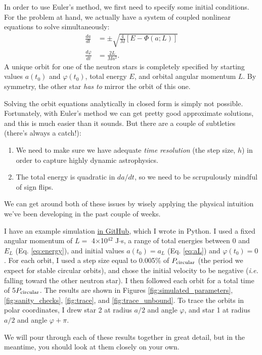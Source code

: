 \documentclass[11pt]{article}
\begin{document}
\begin{enumerate}
\hspace{15pt} In order to use Euler's method, we first need to specify some initial conditions. For the problem at hand, we actually have a system of coupled nonlinear equations to solve simultaneously:
\begin{align*}
\frac{da}{dt} &= \pm \sqrt{ \frac{4}{M} \left[ E - \Phi(a; L) \right] } \\
\frac{d\varphi}{dt} &= \frac{2L}{Ma^2}.
\end{align*}
A unique orbit for one of the neutron stars is completely specified by starting values $a(t_0)$ and $\varphi(t_0)$, total energy $E$, and orbital angular momentum $L$. By symmetry, the other star \emph{has to} mirror the orbit of this one.

\hspace{2pt} Solving the orbit equations analytically in closed form is simply not possible. Fortunately, with Euler's method we can get pretty good approximate solutions, and this is much easier than it sounds. But there are a couple of subtleties (there's always a catch!):
\begin{enumerate}
\item We need to make sure we have adequate \textit{time resolution} (the step size, $h$) in order to capture highly dynamic astrophysics.

\item The total energy is quadratic in $da/dt$, so we need to be scrupulously mindful of sign flips.
\end{enumerate}
We can get around both of these issues by wisely applying the physical intuition we've been developing in the past couple of weeks.

\hspace{15pt}I have an example simulation \href{https://github.com/alurban/mentoring/blob/master/tidal_disruption/scripts/kepler_orbits.py}{in GitHub}, which I wrote in Python. I used a fixed angular momentum of $L=$ 4$\times$10$^{42}$ J$\cdot$s, a range of total energies between 0 and $E_L$ (Eq. \ref{eq:energy}), and initial values $a(t_0) = a_L$ (Eq. \ref{eq:aL}) and $\varphi(t_0) = 0$. For each orbit, I used a step size equal to 0.005\% of $P_{\rm circular}$ (the period we expect for stable circular orbits), and chose the initial velocity to be negative (\textit{i.e.} falling toward the other neutron star). I then followed each orbit for a total time of 5$P_{\rm circular}$. The results are shown in Figures \ref{fig:simulated_parameters}, \ref{fig:sanity_checks}, \ref{fig:trace}, and \ref{fig:trace_unbound}. To trace the orbits in polar coordinates, I drew star 2 at radius $a/2$ and angle $\varphi$, and star 1 at radius $a/2$ and angle $\varphi + \pi$.

\hspace{15pt}We will pour through each of these results together in great detail, but in the meantime, you should look at them closely on your own.

\end{enumerate}
\end{document}
